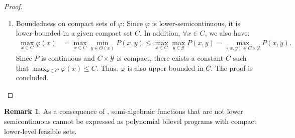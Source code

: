 \documentclass{article}
\newcommand*{\cY}{\mathcal{Y}}
\newcommand{\argmin}{\arg\min}
\newcommand{\firstvar}{x}
\newcommand{\secondvar}{y}
\newcommand{\valbilevel}{\varphi}
\theoremstyle{plain}
\theoremstyle{definition}
\newtheorem{remark}[theorem]{Remark}
\begin{document}
\begin{proof}
\begin{enumerate}[leftmargin=*]
        In the following, we can assume that $\valbilevel(\firstvar_k)$ converges to $\liminf_{k \to \infty} \valbilevel(\firstvar_k)$ and prove this limit is at least $\valbilevel(\firstvar)$. Due to the compactness of $\cY$, the sequence $\secondvar_k$ admits at least an accumulation point ${\secondvar}$. Due to the outer semicontinuity of $\Theta$, ${\secondvar} \in \Theta(\firstvar)$. Due to the continuity of $P$, we also have: $\liminf_{k \to \infty} \valbilevel(\firstvar_k) = P(x,y)$. Therefore,
        \begin{equation*}
            \valbilevel(\firstvar) = P(\firstvar,\secondvar^\star) \leq P(x,y) = \liminf_{k \to \infty} \valbilevel(\firstvar_k),
        \end{equation*}
        where $\secondvar^\star \in \argmin \{P(\firstvar,\secondvar) \mid \secondvar \in \Theta(\firstvar)\}$.
        \item Boundedness on compact sets of $\valbilevel$: Since $\valbilevel$ is lower-semicontinuous, it is lower-bounded in a given compact set $C$. In addition, $\forall \firstvar \in C$, we also have:
        \begin{equation*}
            \begin{aligned}
                \max_{\firstvar \in C} \valbilevel(\firstvar) &= \max_{\firstvar \in C} \min_{\secondvar \in \Theta(\firstvar)}P(\firstvar,\secondvar)
                \leq \max_{\firstvar \in C} \max_{\secondvar \in \cY} P(\firstvar,\secondvar) = \max_{(\firstvar,\secondvar) \in C \times \cY} P(\firstvar,\secondvar).
            \end{aligned}
        \end{equation*}
        Since $P$ is continuous and $C \times \cY$ is compact, there exists a constant $C$ such that $\max_{\firstvar \in C} \valbilevel(\firstvar) \leq C$. Thus, $\valbilevel$ is also upper-bounded in $C$. The proof is concluded. 
    \end{enumerate}   
\end{proof}
\begin{remark}
    As a consequence of , semi-algebraic functions that are not lower semicontinuous cannot be expressed as polynomial bilevel programs with compact lower-level feasible sets. %
\end{remark}
\end{document}
